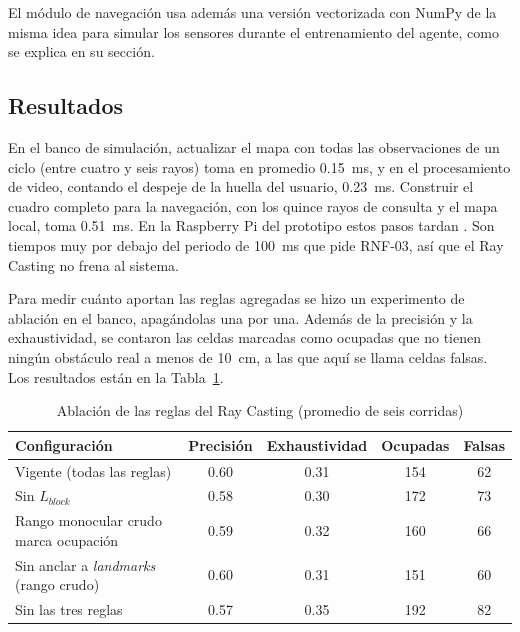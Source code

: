 El módulo de navegación usa además una versión vectorizada con NumPy de la misma idea
para simular los sensores durante el entrenamiento del agente, como se explica en su
sección.

\subsection{Resultados}

En el banco de simulación, actualizar el mapa con todas las observaciones de un ciclo
(entre cuatro y seis rayos) toma en promedio 0.15~ms, y en el procesamiento de video,
contando el despeje de la huella del usuario, 0.23~ms. Construir el cuadro completo para
la navegación, con los quince rayos de consulta y el mapa local, toma 0.51~ms. En la
Raspberry Pi del prototipo estos pasos tardan . Son tiempos muy por debajo del periodo de 100~ms que pide
RNF-03, así que el Ray Casting no frena al sistema.

Para medir cuánto aportan las reglas agregadas se hizo un experimento de ablación en el
banco, apagándolas una por una. Además de la precisión y la exhaustividad, se contaron
las celdas marcadas como ocupadas que no tienen ningún obstáculo real a menos de 10~cm,
a las que aquí se llama celdas falsas. Los resultados están en la
Tabla~\ref{tab:ray_ablacion}.

\begin{table}[H]
\centering
\caption{Ablación de las reglas del Ray Casting (promedio de seis corridas)}
\label{tab:ray_ablacion}
\renewcommand{\arraystretch}{1.2}
\begin{tabular}{|p{6.0cm}|c|c|c|c|}
\hline
\textbf{Configuración} & \textbf{Precisión} & \textbf{Exhaustividad} &
\textbf{Ocupadas} & \textbf{Falsas} \\
\hline
Vigente (todas las reglas) & 0.60 & 0.31 & 154 & 62 \\
Sin $L_{block}$ & 0.58 & 0.30 & 172 & 73 \\
Rango monocular crudo marca ocupación & 0.59 & 0.32 & 160 & 66 \\
Sin anclar a \emph{landmarks} (rango crudo) & 0.60 & 0.31 & 151 & 60 \\
Sin las tres reglas & 0.57 & 0.35 & 192 & 82 \\
\hline
\end{tabular}
\end{table}

